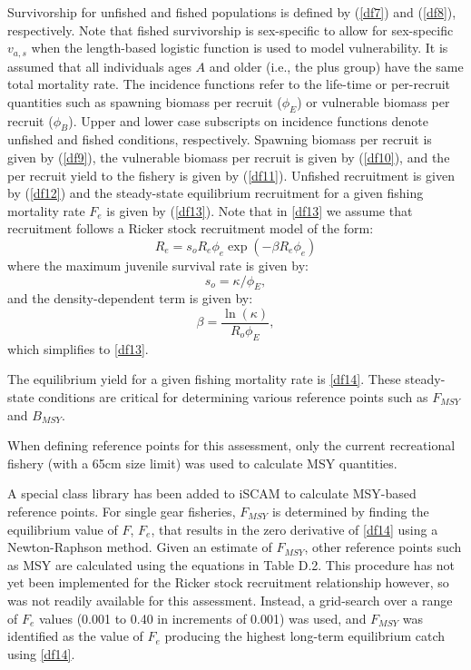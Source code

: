 \documentclass[11pt]{article}   %
\def\AppLet{D}                   %
\def\headc{\vspace{-1ex}} %
\def\subsub#1{\noindent {\bf #1} \headc}    %
\newcommand{\eref}[1]{(\ref{#1})}
\begin{document}
Survivorship for unfished and fished populations is defined by \eref{df7} and \eref{df8}, respectively.  Note that fished survivorship is sex-specific to allow for sex-specific $v_{a,s}$ when the length-based logistic function is used to model vulnerability.  It is assumed that all individuals ages $A$ and older (i.e., the plus group) have the same total mortality rate.  The incidence functions refer to the life-time or per-recruit quantities such as spawning biomass per recruit ($\phi_E$) or vulnerable biomass per recruit ($\phi_B$).  Upper and lower case subscripts on incidence functions denote unfished and fished conditions, respectively.  Spawning biomass per recruit is given by \eref{df9}, the vulnerable biomass per recruit is given by \eref{df10}, and the per recruit yield to the fishery is given by \eref{df11}.  Unfished recruitment is given by \eref{df12} and the steady-state equilibrium recruitment  for a given fishing mortality rate $F_e$ is given by \eref{df13}.  Note that in \eqref{df13} we assume that recruitment follows a  Ricker stock recruitment model of the form:
\[
R_e=%
    s_o R_e \phi_e \exp(-\beta R_e \phi_e) %
\]
where the maximum juvenile survival rate is given by:
\[
s_o = \kappa/\phi_E,
\]
and the density-dependent term is given by:
\[
\beta = %
    {\dfrac {\ln  \left( \kappa \right) }{R_{{o}}\phi_{{E}}}}, %
\]
which simplifies to \eqref{df13}.

The equilibrium yield for a given fishing mortality rate is \eqref{df14}.  These steady-state conditions are critical for determining various reference points such as $F_{MSY}$ and $B_{MSY}$. 


\subsub{MSY-based Reference Points}

When defining reference points for this assessment, only the current recreational fishery (with a 65cm size limit) was used to calculate MSY quantities.  

A special class library has been added to iSCAM to calculate MSY-based reference points.  For single gear fisheries, $F_{MSY}$ is determined by finding the equilibrium value of $F$, $F_e$, that results in the zero derivative of \eqref{df14} using a Newton-Raphson method. Given an estimate of $F_{MSY}$, other reference points such as MSY are calculated using the equations in Table \AppLet.2.  This procedure has not yet been implemented for the Ricker stock recruitment relationship however, so was not readily available for this assessment.  Instead, a grid-search over a range of $F_e$ values (0.001 to 0.40 in increments of 0.001) was used, and $F_{MSY}$ was identified as the value of $F_e$ producing the highest long-term equilibrium catch using \eqref{df14}.       
\end{document}
